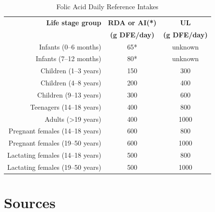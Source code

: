 \documentclass{book}
\begin{document}
\begin{sloppypar}
\begin{table}[ht]
	\caption{Folic Acid Daily Reference Intakes}
	\centering \begin{tabular}{| r | c | c |}
		\hline
		\textbf{Life stage group} & \textbf{RDA or AI(*)} & \textbf{UL}\\
		& \textbf{(\textmu g DFE/day)} & \textbf{(\textmu g DFE/day)}\\ \hline
		Infants (0--6 months) & 65* & unknown\\ \hline
		Infants (7--12 months) & 80* & unknown\\ \hline
		Children (1--3 years) & 150 & 300\\ \hline
		Children (4--8 years) & 200 & 400\\ \hline
		Children (9--13 years) & 300 & 600\\ \hline
		Teenagers (14--18 years) & 400 & 800\\ \hline
		Adults (\textgreater19 years) & 400 & 1000\\ \hline
		Pregnant females (14--18 years) & 600 & 800\\ \hline
		Pregnant females (19--50 years) & 600 & 1000\\ \hline
		Lactating females (14--18 years) & 500 & 800\\ \hline
		Lactating females (19--50 years) & 500 & 1000\\ \hline
	\end{tabular}
\end{table}
\newpage

\section{Sources}



\end{sloppypar}
\end{document}
